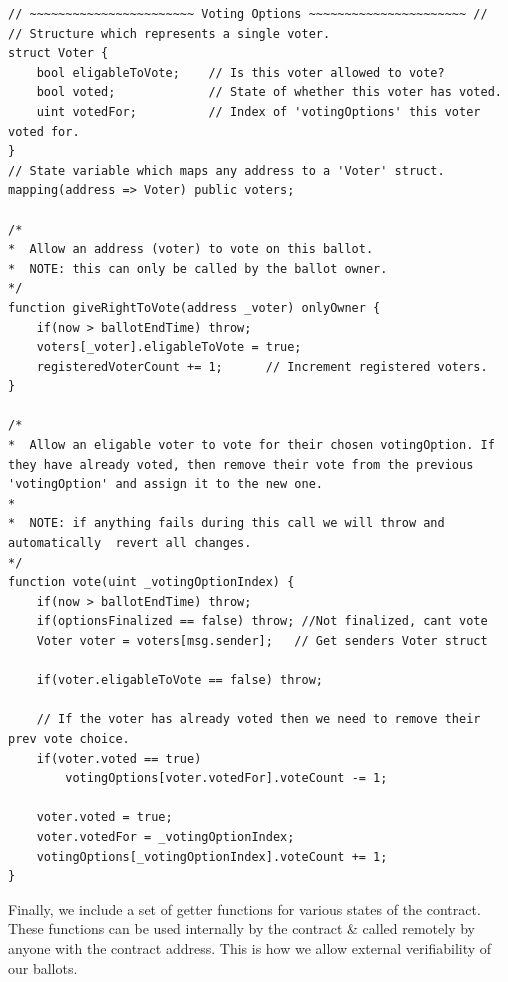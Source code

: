 \documentclass{article}
\begin{document}
\begin{lstlisting}[caption=Contract code relating to voting.]
// ~~~~~~~~~~~~~~~~~~~~~~~ Voting Options ~~~~~~~~~~~~~~~~~~~~~~ //
// Structure which represents a single voter.
struct Voter {
    bool eligableToVote;    // Is this voter allowed to vote?
    bool voted;             // State of whether this voter has voted.
    uint votedFor;          // Index of 'votingOptions' this voter voted for.
}
// State variable which maps any address to a 'Voter' struct.
mapping(address => Voter) public voters;

/*
*  Allow an address (voter) to vote on this ballot.
*  NOTE: this can only be called by the ballot owner.
*/
function giveRightToVote(address _voter) onlyOwner {
    if(now > ballotEndTime) throw;
    voters[_voter].eligableToVote = true;
    registeredVoterCount += 1;      // Increment registered voters.
}

/*
*  Allow an eligable voter to vote for their chosen votingOption. If they have already voted, then remove their vote from the previous 'votingOption' and assign it to the new one.
*
*  NOTE: if anything fails during this call we will throw and automatically  revert all changes.
*/
function vote(uint _votingOptionIndex) {
    if(now > ballotEndTime) throw;
    if(optionsFinalized == false) throw; //Not finalized, cant vote
    Voter voter = voters[msg.sender];   // Get senders Voter struct

    if(voter.eligableToVote == false) throw;

    // If the voter has already voted then we need to remove their prev vote choice.
    if(voter.voted == true) 
        votingOptions[voter.votedFor].voteCount -= 1;

    voter.voted = true;
    voter.votedFor = _votingOptionIndex;
    votingOptions[_votingOptionIndex].voteCount += 1;
}
\end{lstlisting}

Finally, we include a set of getter functions for various states of the contract. These functions can be used internally by the contract \& called remotely by anyone with the contract address. This is how we allow external verifiability of our ballots.
\end{document}
